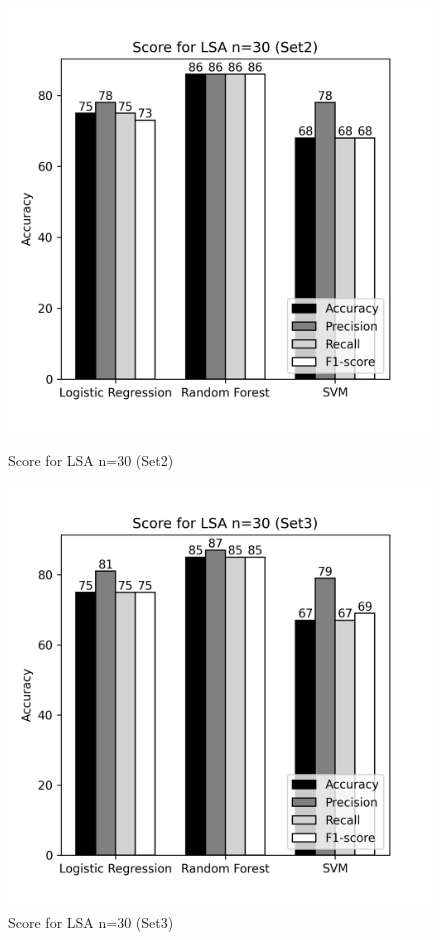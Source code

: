 \documentclass[12pt]{report}
\begin{document}
             \begin{figure}[!htb]
                \begin{minipage}{0.48\textwidth}
                  \centering
                  \includegraphics[scale=0.55]{plots/Score for LSA n=30 (Set2).png}
                  \caption{Score for LSA n=30 (Set2)}\label{Fig:typo1}
                \end{minipage}\hfill
                \begin{minipage}{0.48\textwidth}
                  \centering
                  \includegraphics[scale=0.55]{plots/Score for LSA n=30 (Set3).png}
                  \caption{Score for LSA n=30 (Set3)}\label{Fig:typo2}
                \end{minipage}
             \end{figure}
\end{document}
